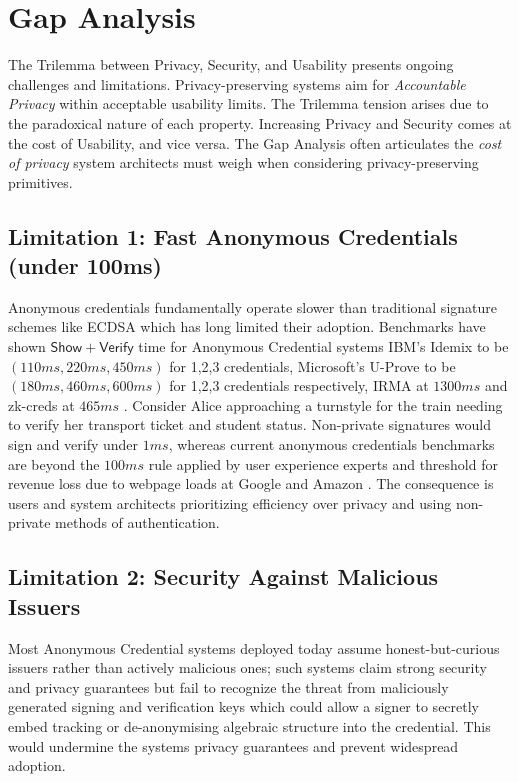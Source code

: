\section{Gap Analysis}
The Trilemma between Privacy, Security, and Usability presents ongoing challenges and limitations. Privacy-preserving systems aim for \emph{Accountable Privacy} within acceptable usability limits. The Trilemma tension arises due to the paradoxical nature of each property. Increasing Privacy and Security comes at the cost of Usability, and vice versa. The Gap Analysis often articulates the \emph{cost of privacy} system architects must weigh when considering privacy-preserving primitives.

\subsection{Limitation 1: Fast Anonymous Credentials (under 100ms) }\label{subsec:chap1_limitation1}

Anonymous credentials fundamentally operate slower than traditional signature schemes like ECDSA which has long limited their adoption. Benchmarks \cite{habib_evaluation_2016} have shown $\mathsf{Show + Verify}$ time for Anonymous Credential systems IBM's Idemix to be $(110ms, 220ms, 450ms)$ for 1,2,3 credentials, Microsoft's U-Prove to be $(180ms, 460ms, 600ms)$ for 1,2,3 credentials respectively, IRMA \cite{fischer-hubner_towards_2013} at $1300ms$ and zk-creds at $465ms$ \cite{rosenberg_zk-creds_2022}. Consider Alice approaching a turnstyle for the train needing to verify her transport ticket and student status. Non-private signatures would sign and verify under $1ms$, whereas current anonymous credentials benchmarks are beyond the $100ms$ rule applied by user experience experts \cite{jakob_nielsen_powers_2009} and threshold for revenue loss due to webpage loads at Google and Amazon \cite{linden_geeking_2006}. The consequence is users and system architects prioritizing efficiency over privacy and using non-private methods of authentication. 


\subsection{Limitation 2: Security Against Malicious Issuers}
Most Anonymous Credential systems deployed today assume honest-but-curious issuers rather than actively malicious ones; such systems claim strong security and privacy guarantees but fail to recognize the threat from maliciously generated signing and verification keys which could allow a signer to secretly embed tracking or de-anonymising algebraic structure into the credential. This would undermine the systems privacy guarantees and prevent widespread adoption. 


